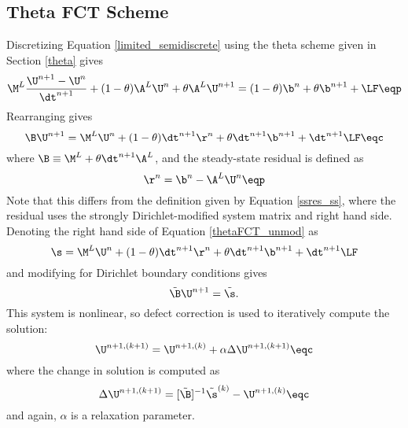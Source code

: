 \subsection{Theta FCT Scheme}
Discretizing Equation \eqref{limited_semidiscrete} using the theta scheme
given in Section \ref{theta} gives
\begin{equation}
   \M^L\frac{\U^{n+1}-\U^n}{\dt^{n+1}} + (1-\theta)\A^L\U^{n}
   + \theta\A^L\U^{n+1} = (1-\theta)\b^n + \theta\b^{n+1}
   + \LF \eqp
\end{equation}
Rearranging gives
\begin{equation}\label{thetaFCT_unmod}
   \B\U^{n+1} = \M^L\U^n + (1-\theta)\dt^{n+1}\r^n + \theta\dt^{n+1}\b^{n+1}
   + \dt^{n+1}\LF \eqc
\end{equation}
where $\B\equiv \M^L + \theta\dt^{n+1}\A^L$, and the steady-state residual
is defined as
\begin{equation}
   \r^n = \b^n - \A^L\U^n \eqp
\end{equation}
Note that this differs from the definition given by Equation \eqref{ssres_ss},
where the residual uses the strongly Dirichlet-modified system matrix and right
hand side. Denoting the right hand side of Equation \eqref{thetaFCT_unmod} as
\begin{equation}
   \s = \M^L\U^n + (1-\theta)\dt^{n+1}\r^n + \theta\dt^{n+1}\b^{n+1} + \dt^{n+1}\LF
\end{equation}
and modifying for Dirichlet boundary conditions gives
\begin{equation}
   \tilde{\B}\U^{n+1} = \tilde{\s}.
\end{equation}
This system is nonlinear, so defect correction is used to iteratively
compute the solution:
\begin{equation}
   \U^{n+1,(k+1)} = \U^{n+1,(k)} + \alpha\Delta\U^{n+1,(k+1)} \eqc
\end{equation}
where the change in solution is computed as
\begin{equation}
   \Delta\U^{n+1,(k+1)} = [\tilde{\B}]^{-1}\tilde{\s}^{(k)} - \U^{n+1,(k)} \eqc
\end{equation}
and again, $\alpha$ is a relaxation parameter.


